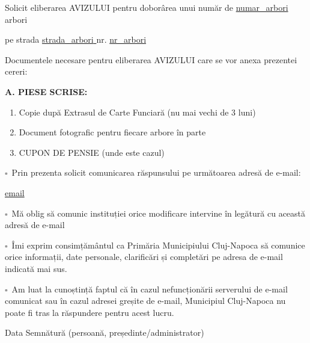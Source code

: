 \documentclass[10pt,a4paper]{article}
\newcommand{\checkboxempty}{$\square$}
\begin{document}
\vspace{0.6cm}

\hspace{1cm}Solicit eliberarea AVIZULUI pentru doborârea unui număr de \underline{ {{numar_arbori}} } arbori

pe strada \underline{ {{strada_arbori}} } nr. \underline{ {{nr_arbori}} }

\vspace{0.3cm}

Documentele necesare pentru eliberarea AVIZULUI care se vor anexa prezentei cereri:

\vspace{0.3cm}

\textbf{A. PIESE SCRISE:}

\vspace{0.3cm}

\begin{enumerate}[leftmargin=2cm]
\item Copie după Extrasul de Carte Funciară (nu mai vechi de 3 luni)
\item Document fotografic pentru fiecare arbore în parte
\item CUPON DE PENSIE (unde este cazul)
\end{enumerate}

\vspace{0.3cm}

\checkboxempty\ Prin prezenta solicit comunicarea răspunsului pe următoarea adresă de e-mail:

\vspace{0.2cm}

\underline{ {{email}} }

\vspace{0.25cm}

\checkboxempty\ Mă oblig să comunic instituției orice modificare intervine în legătură cu această adresă de e-mail

\checkboxempty\ Îmi exprim consimțământul ca Primăria Municipiului Cluj-Napoca să comunice orice informații, date personale, clarificări și completări pe adresa de e-mail indicată mai sus.

\checkboxempty\ Am luat la cunoștință faptul că în cazul nefuncționării serverului de e-mail comunicat sau în cazul adresei greșite de e-mail, Municipiul Cluj-Napoca nu poate fi tras la răspundere pentru acest lucru.

\vspace{0.8cm}

\hspace{1cm}Data \hfill Semnătură \dotfill (persoană, președinte/administrator)\hspace{1cm}
\end{document}
